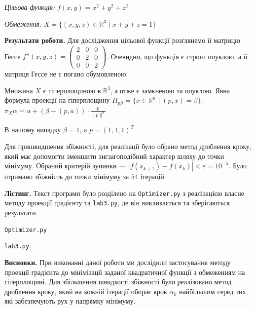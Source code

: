 \documentclass{extreport}
\begin{document}
\emph{Цільова функція:}
$f(x,y) = x^2 + y^2 + z^2$

\emph{Обмеження:}
$X = \{ (x,y,z) \in \mathbb{R}^3 \mid x + y + z = 1 \}$

\noindent\textbf{Результати роботи.}
Для дослідження цільової функції розглянемо її матрицю Гессе
$f''(x,y,z) = \begin{pmatrix}
    2 & 0 & 0 \\
    0 & 2 & 0 \\
    0 & 0 & 2
\end{pmatrix}$. Очевидно, що функція є строго опуклою,
а її матриця Гессе не є погано обумовленою.

Множина $X$ є гіперплощиною в $\mathbb{R}^3$, а отже є замкненою та опуклою.
Явна формула проекції на гіперплощину
$H_{p\beta} = \{x \in \mathbb{R}^n \mid (p,x)=\beta\}$:
$\pi_X\alpha = \alpha + (\beta - (p,a))\cdot \frac{p}{\|p\|^2}$

В нашому випадку $\beta = 1$, а $p=(1,1,1)^T$

Для пришвидшення збіжності, для реалізації було обрано метод дроблення кроку,
який має допомогти зменшити зигзагоподібний характер шляху до точки мінімуму.
Обраний критерій зупинки --- $\left| f(x_{k+1}) - f(x_k)\right| < \varepsilon = 10^{-5}$.
Було отримано збіжність до точки мінімуму за $54$ ітерацій.



\noindent\textbf{Лістинг.}
Текст програми було розділено на \texttt{Optimizer.py} з реалізацією
власне методу проекції градієнту та \texttt{lab3.py}, де він викликається та зберігаються результати.

\noindent\texttt{Optimizer.py}


\noindent\texttt{lab3.py}


\noindent\textbf{Висновки.} При виконанні даної роботи ми дослідили
застосування методу проекції градієнта до мінімізації заданої квадратичної функції 
з обмеженням на гіперплощині. Для збільшення швидкості збіжності було реалізовано метод дроблення кроку,
який на кожній ітерації обирає крок $\alpha_k$ найбільшим серед тих, які забезпечують рух
у напрямку мінімуму.
\end{document}
